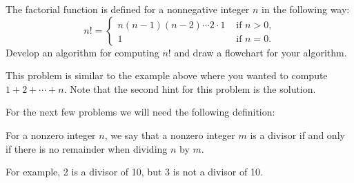 \documentclass{ximera}
\begin{document}
\begin{question}
	The factorial function is defined for a nonnegative integer $n$ in the following way:
	$$n! = \begin{cases}n(n-1)(n-2)\cdots 2\cdot 1 & \text{ if $n>0$,}\\
		1 & \text{ if $n=0$.}
	\end{cases}$$
	Develop an algorithm for computing $n!$ and draw a flowchart for your algorithm.
	\begin{hint}
		This problem is similar to the example above where you wanted to compute $1+2+\cdots+n$. Note that the second hint for this problem is the solution.
	\end{hint}
	\begin{hint}
		\begin{center}
		\end{center}
	\end{hint}
\end{question}

For the next few problems we will need the following definition:

\begin{definition}
	For a nonzero integer $n$, we say that a nonzero integer $m$ is a divisor if and only if there is no remainder when dividing $n$ by $m$.
\end{definition}

For example, 2 is a divisor of 10, but 3 is not a divisor of 10.
\end{document}

